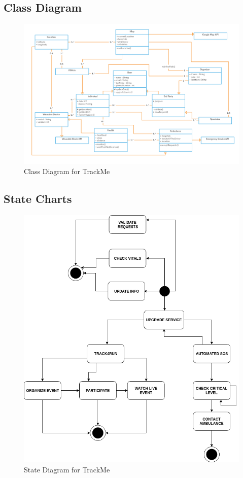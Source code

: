 \subsection{Class Diagram}
\begin{figure}[H]
	\begin{center}	
		\includegraphics[width=\textwidth]{./Diagrams/ClassDiagram.png}
      	\caption{Class Diagram for TrackMe}
        \label{TrackMe_classdiagram}
	\end{center}
\end{figure}

\subsection{State Charts}
\begin{figure}[H]
	\begin{center}
		\includegraphics[width=\textwidth]{./Diagrams/StateDiagram.png}
      	\caption{State Diagram for TrackMe}
        \label{TrackMe_statediagram}
	\end{center}
\end{figure}